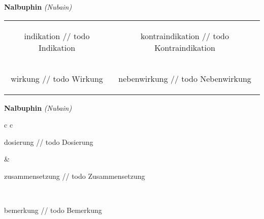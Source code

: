 \documentclass[12pt]{beamer}
\begin{document}
\begin{frame}{
    \textbf{Nalbuphin}
    \textit{(Nubain)}
}
    \begin{tabular}{c c}
        \begin{beamercolorbox}[wd=\boxwidth\textwidth,ht=\boxheight\textheight,sep=1em]{indikation}
        // todo Indikation
        \end{beamercolorbox} & 
        \begin{beamercolorbox}[wd=\boxwidth\textwidth,ht=\boxheight\textheight,sep=1em]{kontraindikation}
        // todo Kontraindikation 
        \end{beamercolorbox} \\
        \begin{beamercolorbox}[wd=\boxwidth\textwidth,ht=\boxheight\textheight,sep=1em]{wirkung}
        // todo Wirkung
        \end{beamercolorbox} & 
        \begin{beamercolorbox}[wd=\boxwidth\textwidth,ht=\boxheight\textheight,sep=1em]{nebenwirkung}
        // todo Nebenwirkung
        \end{beamercolorbox} \\
    \end{tabular}
\end{frame}

\begin{frame}{
    \textbf{Nalbuphin}
    \textit{(Nubain)}
}
    \begin{tabular}{c c}
        \begin{beamercolorbox}[wd=\boxwidth\textwidth,ht=\boxheight\textheight,sep=1em]{dosierung}
        // todo Dosierung
        \end{beamercolorbox} & 
        \begin{beamercolorbox}[wd=\boxwidth\textwidth,ht=\boxheight\textheight,sep=1em]{zusammensetzung}
        // todo Zusammensetzung
        \end{beamercolorbox} \\
        \begin{beamercolorbox}[wd=\textwidth,ht=\boxheight\textheight,sep=1em]{bemerkung}
        // todo Bemerkung
        \end{beamercolorbox} \\
    \end{tabular}
\end{frame}
\end{document}
